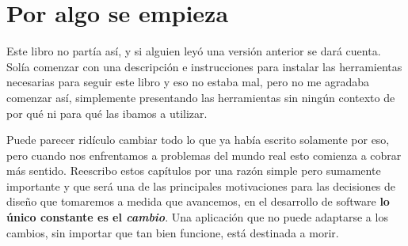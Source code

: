 \chapter{Por algo se empieza}
  Este libro no partía así, y si alguien leyó una versión anterior se dará cuenta.
  Solía comenzar con una descripción e instrucciones para instalar las herramientas necesarias para
  seguir este libro y eso no estaba mal, pero no me agradaba comenzar así, simplemente presentando
  las herramientas sin ningún contexto de por qué ni para qué las ibamos a utilizar.

  Puede parecer ridículo cambiar todo lo que ya había escrito solamente por eso, pero cuando nos 
  enfrentamos a problemas del mundo real esto comienza a cobrar más sentido.
  Reescribo estos capítulos por una razón simple pero sumamente importante y que será una de las
  principales motivaciones para las decisiones de diseño que tomaremos a medida que avancemos, en
  el desarrollo de software \textbf{lo único constante es el 
  \textit{cambio}}.\autocite{head-first-intro}
  Una aplicación que no puede adaptarse a los cambios, sin importar que tan bien funcione, está
  destinada a morir.

  \nocite{*}
  \printbibliography[keyword=Por_algo_se_empieza]
